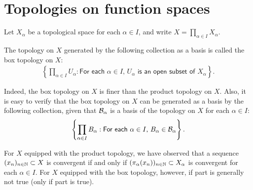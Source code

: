 \section{Topologies on function spaces}

Let $X_\alpha$ be a topological space for each $\alpha\in I$, and write $X=\prod_{\alpha\in I} X_\alpha$.

\begin{defi}
    The topology on $X$ generated by the following collection as a basis is called the box topology on $X$:
    \begin{align*}
        \left\{\prod_{\alpha\in I} U_\alpha: \textsf{For each $\alpha\in I$, $U_\alpha$ is an open subset of $X_\alpha$}\right\}.
    \end{align*}
\end{defi}

Indeed, the box topology on $X$ is finer than the product topology on $X$.
Also, it is easy to verify that the box topology on $X$ can be generated as a basis by the following collection, given that ${\mathcal{B}}_\alpha$ is a basis of the topology on $X$ for each $\alpha\in I$:
\begin{align*}
    \left\{\prod_{\alpha\in I} B_\alpha: \textsf{For each $\alpha\in I$, $B_\alpha\in{\mathcal{B}}_\alpha$}\right\}.
\end{align*}

\begin{rmk}
    For $X$ equipped with the product topology, we have observed that a sequence $(x_n)_{n\in{\mathbb{N}}}\subset X$ is convergent if and only if $(\pi_\alpha(x_n))_{n\in{\mathbb{N}}}\subset X_\alpha$ is convergent for each $\alpha\in I$.
    For $X$ equipped with the box topology, however, if part is generally not true (only if part is true).
\end{rmk}

